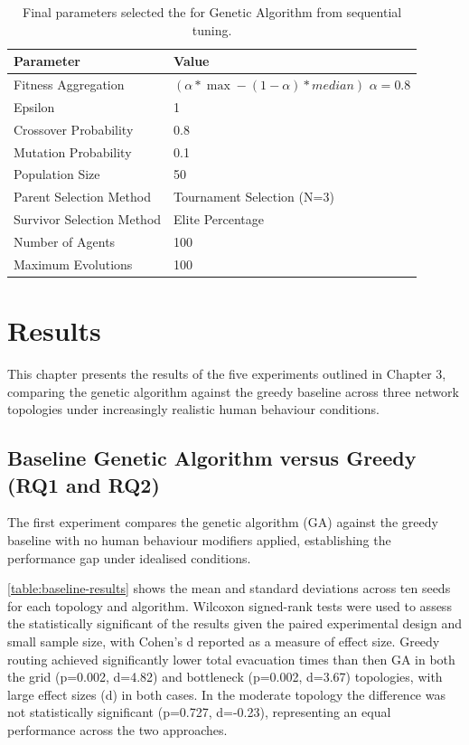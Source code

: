 \documentclass[12pt,a4paper]{report}
\begin{document}
\begin{table}[htb]
  \bigskip
  \begin{center}
    \begin{tabular}{|l|l|}
      \hline
      Parameter & Value \\
      \hline
      \hline
      Fitness Aggregation & $(\alpha * \max - (1-\alpha)*median)$ $\alpha = 0.8$ \\
      Epsilon & 1 \\
      Crossover Probability & 0.8 \\
      Mutation Probability & 0.1 \\
      Population Size & 50 \\
      Parent Selection Method & Tournament Selection (N=3) \\
      Survivor Selection Method & Elite Percentage \\
      Number of Agents & 100 \\
      Maximum Evolutions & 100 \\
      \hline
    \end{tabular}
  \end{center}
\caption[Final parameters for the Genetic Algorithm]{Final parameters selected the for Genetic Algorithm from sequential tuning.}
\label{table:ga-final-params}
\end{table}

\chapter{Results}
This chapter presents the results of the five experiments outlined in Chapter 3, comparing the genetic algorithm against the greedy baseline across three network topologies under increasingly realistic human behaviour conditions.

\section{Baseline Genetic Algorithm versus Greedy (RQ1 and RQ2)}
The first experiment compares the genetic algorithm (GA) against the greedy baseline with no human behaviour modifiers applied, establishing the performance gap under idealised conditions. 

\autoref{table:baseline-results} shows the mean and standard deviations across ten seeds for each topology and algorithm. Wilcoxon signed-rank tests were used to assess the statistically significant of the results given the paired experimental design and small sample size, with Cohen’s d reported as a measure of effect size. Greedy routing achieved significantly lower total evacuation times than then GA in both the grid (p=0.002, d=4.82) and bottleneck (p=0.002, d=3.67) topologies, with large effect sizes (d) in both cases. In the moderate topology the difference was not statistically significant (p=0.727, d=-0.23), representing an equal performance across the two approaches.
\end{document}
